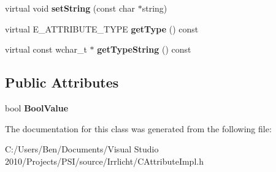 \begin{DoxyCompactItemize}
\item 
\hypertarget{classirr_1_1io_1_1_c_bool_attribute_a52436655edb8f2edc760d73b4572340f}{virtual void {\bfseries set\-String} (const char $\ast$string)}\label{classirr_1_1io_1_1_c_bool_attribute_a52436655edb8f2edc760d73b4572340f}

\item 
\hypertarget{classirr_1_1io_1_1_c_bool_attribute_a1ac373ad8c55e7bbf1338193d046d774}{virtual E\-\_\-\-A\-T\-T\-R\-I\-B\-U\-T\-E\-\_\-\-T\-Y\-P\-E {\bfseries get\-Type} () const }\label{classirr_1_1io_1_1_c_bool_attribute_a1ac373ad8c55e7bbf1338193d046d774}

\item 
\hypertarget{classirr_1_1io_1_1_c_bool_attribute_a48cf492bc0fce7e94c3822030b61ed7f}{virtual const wchar\-\_\-t $\ast$ {\bfseries get\-Type\-String} () const }\label{classirr_1_1io_1_1_c_bool_attribute_a48cf492bc0fce7e94c3822030b61ed7f}

\end{DoxyCompactItemize}
\subsection*{Public Attributes}
\begin{DoxyCompactItemize}
\item 
\hypertarget{classirr_1_1io_1_1_c_bool_attribute_a32d7086f5d95616d638c294d9baa9b78}{bool {\bfseries Bool\-Value}}\label{classirr_1_1io_1_1_c_bool_attribute_a32d7086f5d95616d638c294d9baa9b78}

\end{DoxyCompactItemize}


The documentation for this class was generated from the following file\-:\begin{DoxyCompactItemize}
\item 
C\-:/\-Users/\-Ben/\-Documents/\-Visual Studio 2010/\-Projects/\-P\-S\-I/source/\-Irrlicht/C\-Attribute\-Impl.\-h\end{DoxyCompactItemize}

